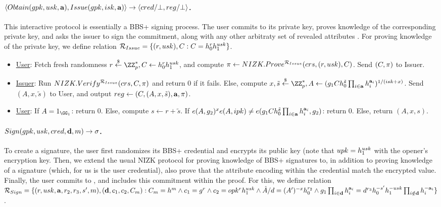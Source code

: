 \paragraph{$\langle Obtain(gpk,usk,\mathbf{a}),Issue(gpk,isk,\mathbf{a}) \rangle
  \rightarrow \langle cred/\bot,reg/\bot \rangle$.} %
This interactive protocol is essentially a BBS+ signing  process. The user
commits to its private key, proves knowledge of the corresponding private
key, and asks the issuer to sign the commitment, along with any other arbitraty
set of revealed attributes \attrs. For proving knowledge of the private key, we
define relation $\mathcal{R}_{Issue} = \lbrace (r, usk), C: C =
h_0^rh_1^{usk}\rbrace$.

\begin{itemize}
\item \underline{User}: Fetch fresh randomness $r \getr \ZZ^*_p,
  \Ccom \gets \gen{h}_0^r\gen{h}_1^{\usk}$, and compute $\pi \gets
  NIZK.Prove^{\mathcal{R}_{Issue}}(crs,(r,usk),
  C)$. Send $(C,\pi)$ to Issuer.
\item \underline{Issuer}: Run $NIZK.Verify^{\mathcal{R}_{Issue}}(crs,C,
  \pi)$ and return $0$ if it fails. Else, compute
  $x,\tilde{s} \getr \ZZ^*_p, A \gets
  (\gen{g}_1\Ccom h_0^{\tilde{s}} \prod_{i \in \attrs}
  \gen{h}_i^{\attrs_i})^{1/(\isk+x)}$.
  Send $(A,x,\tilde{s})$ to User, and output $reg \gets
  (C,(A,x,\tilde{s}),\mathbf{a},\pi)$.
\item \underline{User}: If $A = 1_{\GG_1}$: return $0$. Else, compute
  $s \gets r + \tilde{s}$. If $e(A,g_2)^xe(A,ipk) \neq
  e(g_1Ch_0^{\tilde{s}}\prod_{i \in \mathbf{a}}h_i^{\mathbf{a}_i},
  g_2)$: return $0$. Else, return
  $(A,x,s)$.
\end{itemize}

\paragraph{$Sign(gpk,usk,cred,\mathbf{d},m) \rightarrow \sigma$.} %
To create a signature, the user first randomizes its BBS+ credential \cred and
encrypts its public key \upk (note that $upk=h_1^{usk}$ with the
opener's encryption key. Then, we extend the usual NIZK protocol for proving
knowledge of BBS+ signatures \cite{cdl16b} to, in addition to proving knowledge
of a signature (which, for us is the user credential), also prove that the
attribute encoding \usk within the credential match the encrypted value.
Finally, the user commits to \msg, and includes this commitment within the
proof. For this, we define relation
$\mathcal{R}_{Sign}= \lbrace (r,usk,\mathbf{a},r_2,r_3,s',m),(\mathbf{d},c_1,c_2,
C_{m}): C_{m} = h^m \land c_1 = g^r \land c_2 = opk^rh_1^{usk}
\land \hat{A}/d = (A')^{-x}h_0^{r_2} \land
g_1 \prod_{i \in \mathbf{d}} h_i^{\mathbf{a}_i} =
d^{r_3}h_0^{-s'}h_1^{-usk}
\prod_{i \notin \mathbf{d}} h_i^{-\mathbf{a}_i} \rbrace$.

